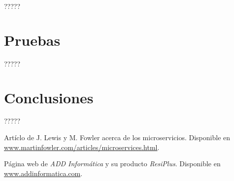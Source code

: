 \documentclass[11pt,spanish,listoffigures]{tfgetsinf}
\begin{document}
?????


\chapter{Pruebas}

?????


\chapter{Conclusiones}

?????


\begin{thebibliography}{10}

	Artíclo de J. Lewis y M. Fowler acerca de los microservicios.
	\newblock Disponible en
	\url{www.martinfowler.com/articles/microservices.html}.

	Página web de \emph{ADD Informática} y su producto \emph{ResiPlus}.
	\newblock Disponible en
	\url{www.addinformatica.com}.

\end{thebibliography}
\end{document}
